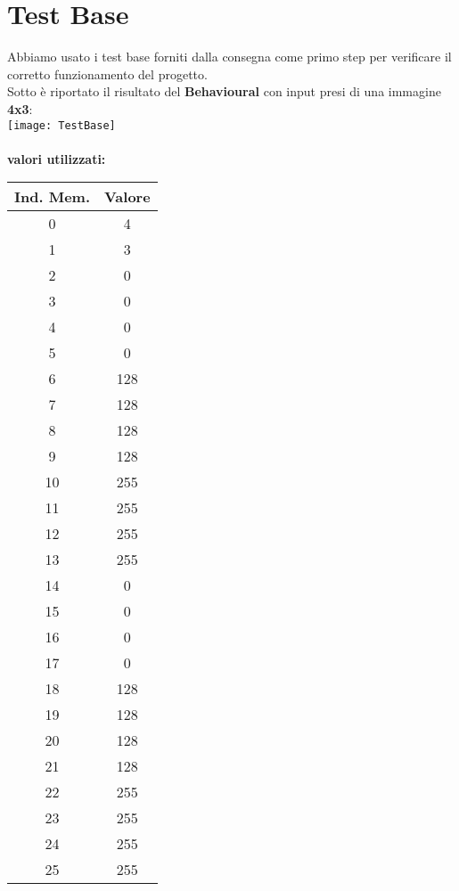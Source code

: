 \documentclass[a4paper, 12pt]{report}
\begin{document}
		\section{Test Base}
			Abbiamo usato i test base forniti dalla consegna come primo step per verificare il corretto funzionamento del progetto.\\
			Sotto è riportato il risultato del \textbf{Behavioural} con input presi di una immagine \textbf{4x3}:\\
			\texttt{[image: TestBase]}\\\\
			\textbf{valori utilizzati:}\\
			\begin{center}
			\begin{tabular}{|c | c|}
					 \hline Ind. Mem. & Valore \\ \hline 
								0 & 4\\ \hline
								1 & 3\\ \hline
								2 & 0\\ \hline
								3 & 0\\ \hline
								4 &	0 \\ \hline
								5 & 0\\ \hline
								6 & 128\\ \hline
								7 &  128\\ \hline
								8 &  128 \\ \hline
								9 &  128\\ \hline
								10 & 255\\ \hline
								11 & 255\\ \hline
								12 & 255 \\ \hline
								13 & 255\\ \hline
								14 & 0\\ \hline
								15 & 0\\ \hline
								16 & 0 \\ \hline
								17 & 0\\ \hline
								18 & 128\\ \hline
								19 & 128\\ \hline
								20 &	128 \\ \hline
								21 & 128\\ \hline
								22 & 255\\ \hline
								23 &	255 \\ \hline
								24 & 255\\ \hline
								25 & 255\\ \hline
				\end{tabular}
				\end{center}
\end{document}
